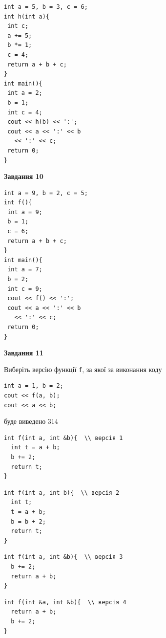 \documentclass[12pt, ukrainian]{article}
\def\code#1{\Verb!#1!}
\begin{document}
{\begin {large}
\begin{minipage}[t]{7.0cm}
\begin{verbatim}
int a = 5, b = 3, c = 6;
int h(int a){
 int c;
 a += 5;
 b *= 1;
 c = 4;
 return a + b + c;
}
int main(){
 int a = 2;
 b = 1;
 int c = 4;
 cout << h(b) << ':';
 cout << a << ':' << b 
   << ':' << c;
 return 0;
}
\end{verbatim}



\begin{center}
\textbf{Завдання 10}
\end{center}
\vspace{-8mm}

\begin{verbatim}
int a = 9, b = 2, c = 5;
int f(){
 int a = 9;
 b = 1;
 c = 6;
 return a + b + c;
}
int main(){
 int a = 7;
 b = 2;
 int c = 9;
 cout << f() << ':';
 cout << a << ':' << b 
   << ':' << c;
 return 0;
}
\end{verbatim}

\end{minipage}
\vline \hspace{1mm}
\begin{minipage}[t]{11.0cm}

\begin{center}
\textbf{Завдання 11}
\end{center}
Виберіть версію функції \code{f}, за якої за виконання коду
\begin{verbatim}
int a = 1, b = 2;
cout << f(a, b);
cout << a << b;
\end{verbatim}

буде виведено 314

\begin{verbatim}
int f(int a, int &b){  \\ версія 1
  int t = a + b;
  b += 2;
  return t;
}
\end{verbatim}

\vspace{-8mm}\begin{verbatim}
int f(int a, int b){  \\ версія 2
  int t;
  t = a + b;
  b = b + 2;
  return t;
}
\end{verbatim}

\vspace{-8mm}\begin{verbatim}
int f(int a, int &b){  \\ версія 3
  b += 2;
  return a + b;
}
\end{verbatim}

\vspace{-8mm}\begin{verbatim}
int f(int &a, int &b){  \\ версія 4
  return a + b;
  b += 2;
}
\end{verbatim}




\end{minipage}
\end{large}}
\end{document}
